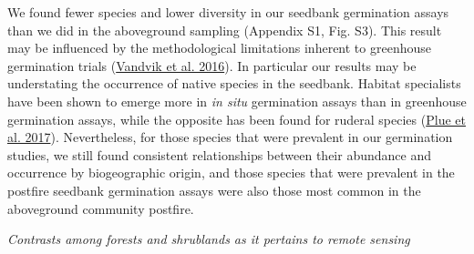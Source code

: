 \documentclass[
  12pt,
]{article}
\begin{document}
We found fewer species and lower diversity in our seedbank germination
assays than we did in the aboveground sampling (Appendix S1, Fig. S3).
This result may be influenced by the methodological limitations inherent
to greenhouse germination trials
(\protect\hyperlink{ref-Vandvik2016}{Vandvik et al. 2016}). In
particular our results may be understating the occurrence of native
species in the seedbank. Habitat specialists have been shown to emerge
more in \emph{in situ} germination assays than in greenhouse germination
assays, while the opposite has been found for ruderal species
(\protect\hyperlink{ref-Plue2017}{Plue et al. 2017}). Nevertheless, for
those species that were prevalent in our germination studies, we still
found consistent relationships between their abundance and occurrence by
biogeographic origin, and those species that were prevalent in the
postfire seedbank germination assays were also those most common in the
aboveground community postfire.

\emph{Contrasts among forests and shrublands as it pertains to remote
sensing}
\end{document}
